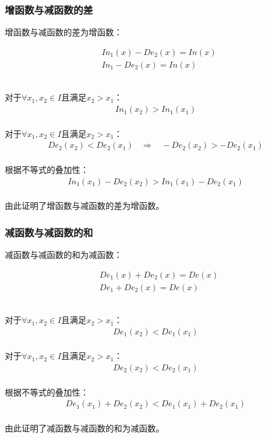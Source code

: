 \documentclass[UTF8]{ctexart}
\begin{document}
\subsubsection{增函数与减函数的差}
    \setcounter{equation}{0}
    增函数与减函数的差为增函数：
    \begin{large}
        \begin{align*}
            &In_1(x)-De_2(x)=In(x)\\[3mm]
            &In_1-De_2(x)=In(x)
        \end{align*}
    \end{large}\\
    对于$\forall x_1,x_2\in I$且满足$x_2>x_1$：
    \begin{align}
        In_1(x_2)>In_1(x_1)
    \end{align}\\
    对于$\forall x_1,x_2\in I$且满足$x_2>x_1$：\vspace{5pt}
    \begin{align}
        De_2(x_2)<De_2(x_1)~~~~\Longrightarrow~~~~-De_2(x_2)>-De_2(x_1)
    \end{align}\\
    根据不等式的叠加性：
    \begin{align}
        In_1(x_1)-De_2(x_2)>In_1(x_1)-De_2(x_1)
    \end{align}\\
    由此证明了增函数与减函数的差为增函数。\vspace{5pt}

\newpage

\subsubsection{减函数与减函数的和}
    \setcounter{equation}{0}
    减函数与减函数的和为减函数：
    \begin{large}
        \begin{align*}
            &De_1(x)+De_2(x)=De(x)\\[3mm]
            &De_1+De_2(x)=De(x)
        \end{align*}
    \end{large}\\
    对于$\forall x_1,x_2\in I$且满足$x_2>x_1$：
    \begin{align}
        De_1(x_2)<De_1(x_1)
    \end{align}\\
    对于$\forall x_1,x_2\in I$且满足$x_2>x_1$：
    \begin{align}
        De_2(x_2)<De_2(x_1)
    \end{align}\\
    根据不等式的叠加性：
    \begin{align}
        De_1(x_1)+De_2(x_2)<De_1(x_1)+De_2(x_1)
    \end{align}\\
    由此证明了减函数与减函数的和为减函数。\vspace{6pt}
\end{document}
